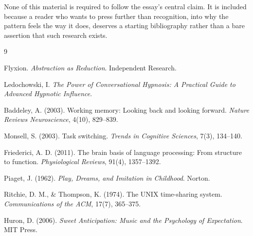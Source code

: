 \documentclass[11pt]{article}
\begin{document}
None of this material is required to follow the essay's central claim. It is included because a reader who wants to press further than recognition, into why the pattern feels the way it does, deserves a starting bibliography rather than a bare assertion that such research exists.

\begin{thebibliography}{9}

Flyxion. \emph{Abstraction as Reduction}. Independent Research.

Ledochowski, I. \emph{The Power of Conversational Hypnosis: A Practical Guide to Advanced Hypnotic Influence}.

Baddeley, A. (2003). Working memory: Looking back and looking forward. \emph{Nature Reviews Neuroscience}, 4(10), 829--839.

Monsell, S. (2003). Task switching. \emph{Trends in Cognitive Sciences}, 7(3), 134--140.

Friederici, A. D. (2011). The brain basis of language processing: From structure to function. \emph{Physiological Reviews}, 91(4), 1357--1392.

Piaget, J. (1962). \emph{Play, Dreams, and Imitation in Childhood}. Norton.

Ritchie, D. M., \& Thompson, K. (1974). The UNIX time-sharing system. \emph{Communications of the ACM}, 17(7), 365--375.

Huron, D. (2006). \emph{Sweet Anticipation: Music and the Psychology of Expectation}. MIT Press.

\end{thebibliography}
\end{document}
